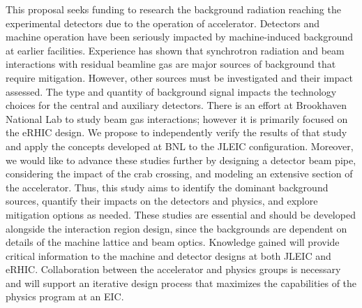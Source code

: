 This proposal seeks funding to research the background radiation reaching the experimental detectors due to the operation of accelerator.  Detectors and machine operation have been seriously impacted by machine-induced background at earlier facilities.  Experience has shown that synchrotron radiation and beam interactions with residual beamline gas are major sources of background that require mitigation.  However, other sources must be investigated and their impact assessed.   The type and quantity of background signal impacts the technology choices for the central and auxiliary detectors. There is an effort at Brookhaven National Lab to study beam gas interactions; however it is primarily focused on the eRHIC design.  We propose to independently verify the results of that study and apply the concepts developed at BNL to the JLEIC configuration.  Moreover, we would like to advance these studies further by designing a detector beam pipe, considering the impact of the crab crossing, and modeling an extensive section of the accelerator.   Thus, this study aims to identify the dominant background sources, quantify their impacts on the detectors and physics, and explore mitigation options as needed.  These studies are essential and should be developed alongside the interaction region design, since the backgrounds are dependent on details of the machine lattice and beam optics.  Knowledge gained will provide critical information to the machine and detector designs at both JLEIC and eRHIC.  Collaboration between the accelerator and physics groups is necessary and will support an iterative design process that maximizes the capabilities of the physics program at an EIC.






